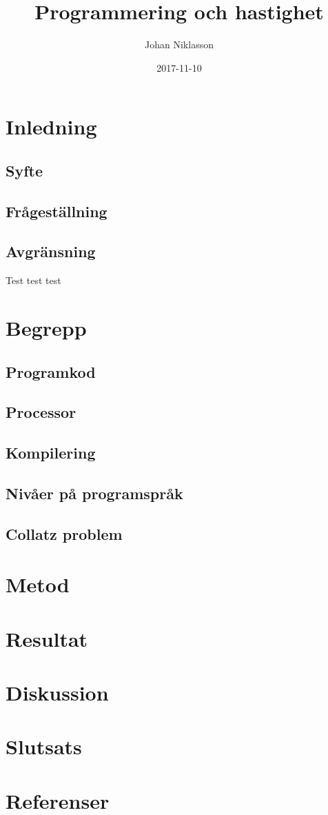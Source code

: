 \documentclass[swedish]{report}
\title{Programmering och hastighet}
\author{Johan Niklasson}
\date{2017-11-10}
\begin{document}
\maketitle
\tableofcontents

\clearpage

\section{Inledning}
\subsection{Syfte}
\subsection{Frågeställning}
\subsection{Avgränsning}
Test test test \cite{maloney_resnick_rusk_silverman_eastmond_2010}

\section{Begrepp}
\subsection{Programkod}
\subsection{Processor}
\subsection{Kompilering}
\subsection{Nivåer på programspråk}
\subsection{Collatz problem}

\section{Metod}

\section{Resultat}

\section{Diskussion}

\section{Slutsats}

\section{Referenser}
\printbibliography
\end{document}
